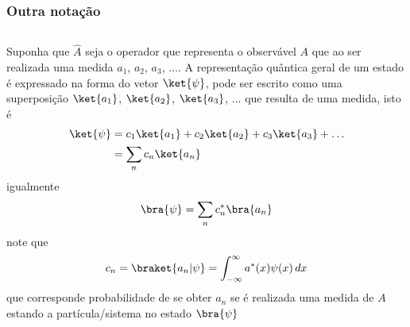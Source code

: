 \documentclass[12pt,brazil,table]{beamer}
\begin{document}
\begin{frame}
  \frametitle{Outra notação}
  \fontsize{7pt}{11pt}\selectfont
  
  \begin{columns}[T]


  Suponha que $\hat{A}$ seja o operador que representa o observável $A$ que ao ser realizada uma medida $a_1$, $a_2$, $a_3$, $\ldots$.  A representação quântica geral de um estado é expressado na forma do vetor $\ket{\psi}$, pode ser escrito como uma superposição $\ket{a_1}$, $\ket{a_2}$, $\ket{a_3}$, $\ldots$ que resulta de uma medida, isto é \vspace*{-0.25cm}
  \[
  \begin{align*}
    \ket{\psi} &= c_1\ket{a_1} + c_2\ket{a_2} + c_3\ket{a_3} + \ldots\\
    &= \sum_n c_n\ket{a_n}
  \end{align*}\vspace*{-0.5cm}
  \]
  igualmente
  \[
    \bra{\psi} = \sum_n c_n^* \bra{a_n}
  \]
  note que\vspace*{-0.5cm}
  \[
   c_n=\braket{a_n|\psi}=\int_{-\infty}^\infty a^*(x)\psi(x)\, dx\vspace*{-0.25cm}
  \]
  que corresponde probabilidade de se obter $a_n$ se é realizada uma medida de $A$ estando a partícula/sistema no estado $\bra{\psi}$\\
  

\end{columns}
\end{frame}
\end{document}
